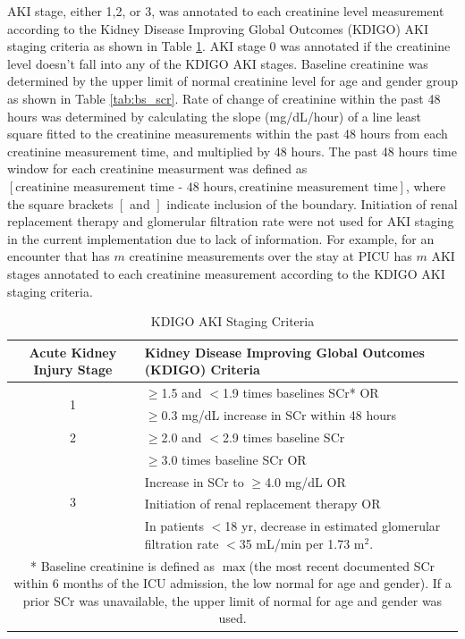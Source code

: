 \documentclass[
   technote
]{phildoc}
\newcommand{\tab}{Table}
\begin{document}
AKI stage, either 1,2, or 3, was annotated to each creatinine level measurement according to the Kidney Disease Improving Global Outcomes (KDIGO) AKI staging criteria \cite{kdigo2012guideline} as shown in \tab{} \ref{tab:AKI_def}. AKI stage 0 was annotated if the creatinine level doesn't fall into any of the KDIGO AKI stages. Baseline creatinine was determined by the upper limit of normal creatinine level for age and gender group \cite{schwartz1976plasma, bellomo2004acute, schneider2010serum} as shown in \tab{} \ref{tab:bs_scr}. Rate of change of creatinine within the past 48 hours was determined by calculating the slope (mg/dL/hour) of a line least square fitted to the creatinine measurements within the past 48 hours from each creatinine measurement time, and multiplied by 48 hours. The past 48 hours time window for each creatinine measurment was defined as $\left[\text{creatinine measurement time - 48 hours}, \text{creatinine measurement time} \right]$, where the square brackets $\left[ \right.$ and $\left. \right]$ indicate inclusion of the boundary. Initiation of renal replacement therapy and glomerular filtration rate were not used for AKI staging in the current implementation due to lack of information. For example, for an encounter that has $m$ creatinine measurements over the stay at PICU has $m$ AKI stages annotated to each creatinine measurement according to the KDIGO AKI staging criteria. 

\begin{table}[!htbp]
\centering
\caption{KDIGO AKI Staging Criteria}
\label{tab:AKI_def}
\begin{tabular}{|c | p{7cm}|}
\hline
Acute Kidney Injury Stage & Kidney Disease Improving Global Outcomes (KDIGO) Criteria \\ \hline \hline
\multirow{2}{*}{1}
& $\geq$1.5 and $<$1.9 times baselines SCr* OR \\
& $\geq$0.3 mg/dL increase in SCr within 48 hours \\ \hline
2 & $\geq$2.0 and $<$2.9 times baseline SCr \\ \hline
\multirow{4}{*}{3}
& $\geq$3.0 times baseline SCr OR \\
& Increase in SCr to $\geq$4.0 mg/dL OR \\
& Initiation of renal replacement therapy OR \\
& In patients $<$18 yr, decrease in estimated glomerular filtration rate $<$35 mL/min per 1.73 m$^2$. \\ \hline

\multicolumn{2}{p{11.5cm}}{\vspace{0.1em} * Baseline creatinine is defined as $\max{}$(the most recent documented SCr within 6 months of the ICU admission, the low normal for age and gender). If a prior SCr was unavailable, the upper limit of normal for age and gender was used.}
\end{tabular}
\end{table}
\end{document}
